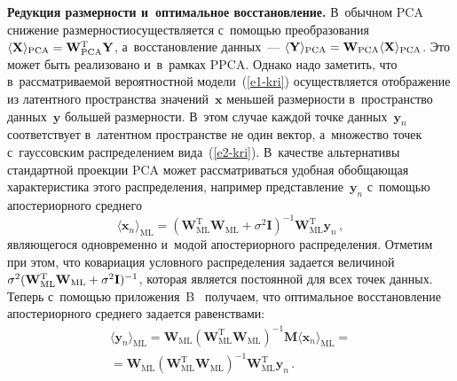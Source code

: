 \begin{multicols}{2}
     \textbf{Редукция размерности и~оптимальное вос\-ста\-нов\-ле\-ние.} 
В~обычном PCA снижение размерности\linebreak осуществля\-ется с~помощью 
преобразования $\langle \mathbf{X}\rangle_{\mathrm{PCA}}\hm= 
\mathbf{W}_{\mathrm{PCA}}^{\mathrm{T}}\mathbf{Y}$, а~восстановление данных~--- 
$\langle \mathbf{Y}\rangle_{\mathrm{PCA}}\hm= \mathbf{W}_{\mathrm{PCA}} \langle 
\mathbf{X}\rangle_{\mathrm{PCA}}$. Это может быть реализовано и~в~рамках PPCA. 
Однако надо заметить, что в~рассматриваемой вероятностной  
модели~(\ref{e1-kri}) осуществляется отображение из латентного пространства 
значений~$\mathbf{x}$ меньшей размерности в~пространство 
данных~$\mathbf{y}$ большей размерности. В~этом случае каж\-дой точке 
данных~$\mathbf{y}_n$ соответствует в~латентном пространстве не один вектор, 
а~множество точек с~гауссовским распределением вида~(\ref{e2-kri}). 
В~качестве альтернативы стандартной проекции PCA может рассматриваться 
удобная обобщающая характеристика этого распределения, например 
представление~$\mathbf{y}_n$ с~по\-мощью апостериорного среднего
     $$
     \langle \mathbf{x}_n\rangle_{\mathrm{ML}} =\left(\mathbf{W}^{\mathrm{T}}_{\mathrm{ML}} 
\mathbf{W}_{\mathrm{ML}} +\sigma^2\mathbf{I}\right)^{-1} 
\mathbf{W}_{\mathrm{ML}}^{\mathrm{T}} \mathbf{y}_n\,,
     $$
являющегося одновременно и~модой апостериорного распределения. Отметим 
при этом, что ко\-вариация условного распределения задается ве\-ли\-чиной 
$\sigma^2(\mathbf{W}_{\mathrm{ML}}^{\mathrm{T}} \mathbf{W}_{\mathrm{ML}} \hm+ 
\sigma^2\mathbf{I})^{-1}$, которая является\linebreak
 постоянной для всех точек данных. 
Теперь с~по\-мощью приложения~B~\cite{3-kri} получаем, что оптимальное 
восстановление апостериорного среднего задается равенствами:
\begin{multline*}
\langle \mathbf{y}_n\rangle_{\mathrm{ML}} =\mathbf{W}_{\mathrm{ML}} 
\left(\mathbf{W}_{\mathrm{ML}}^{\mathrm{T}} \mathbf{W}_{\mathrm{ML}}\right)^{-1} 
\mathbf{M}\langle \mathbf{x}_n \rangle_{\mathrm{ML}}={}\\
{}= \mathbf{W}_{\mathrm{ML}} \left(
\mathbf{W}_{\mathrm{ML}}^{\mathrm{T}} 
\mathbf{W}_{\mathrm{ML}}\right)^{-1} \mathbf{W}^{\mathrm{T}}_{\mathrm{ML}} \mathbf{y}_n\,.
\end{multline*}
     

\end{multicols}
